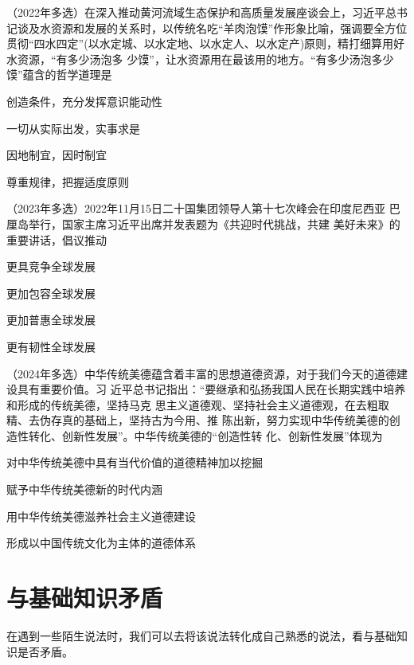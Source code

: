 \documentclass[lang=cn,newtx,10pt,scheme=chinese,pad,twocol]{zznote}
\begin{document}
\begin{example}
	（2022年多选）在深入推动黄河流域生态保护和高质量发展座谈会上，习近平总书记谈及水资源和发展的关系时，以传统名吃“羊肉泡馍”作形象比喻，强调要全方位贯彻“四水四定”(以水定城、以水定地、以水定人、以水定产)原则，精打细算用好水资源，“有多少汤泡多
	少馍”，让水资源用在最该用的地方。“有多少汤泡多少馍”蕴含的哲学道理是
	\begin{choice}
		\item 创造条件，充分发挥意识能动性
		\item 一切从实际出发，实事求是
		\item 因地制宜，因时制宜
		\item 尊重规律，把握适度原则
	\end{choice}
\end{example}


\begin{example}	（2023年多选）2022年11月15日二十国集团领导人第十七次峰会在印度尼西亚
	巴厘岛举行，国家主席习近平出席并发表题为《共迎时代挑战，共建
	美好未来》的重要讲话，倡议推动
	\begin{choice}
		\item 更具竞争全球发展
		\item 更加包容全球发展
		\item 更加普惠全球发展
		\item 更有韧性全球发展
	\end{choice}
\end{example}

\begin{example} （2024年多选）中华传统美德蕴含着丰富的思想道德资源，对于我们今天的道德建设具有重要价值。习 近平总书记指出：“要继承和弘扬我国人民在长期实践中培养和形成的传统美德，坚持马克 思主义道德观、坚持社会主义道德观，在去粗取精、去伪存真的基础上，坚持古为今用、推 陈出新，努力实现中华传统美德的创造性转化、创新性发展”。中华传统美德的“创造性转 化、创新性发展”体现为
	\begin{choice}
		\item 对中华传统美德中具有当代价值的道德精神加以挖掘
		\item 赋予中华传统美德新的时代内涵
		\item 用中华传统美德滋养社会主义道德建设
		\item 形成以中国传统文化为主体的道德体系
	\end{choice}
\end{example}

\section{与基础知识矛盾}
\begin{definition}
	在遇到一些陌生说法时，我们可以去将该说法转化成自己熟悉的说法，看与基础知识是否矛盾。
\end{definition}
\end{document}
